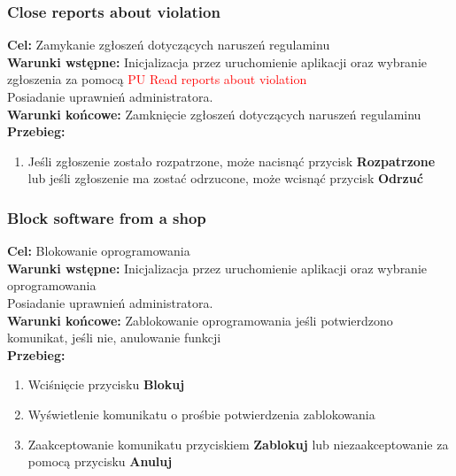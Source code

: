 \documentclass[12pt,a4paper]{article}
\begin{document}
\subsubsection{Close reports about violation}
\textbf{Cel: } Zamykanie zgłoszeń dotyczących naruszeń regulaminu\\
\textbf{Warunki wstępne:} Inicjalizacja przez uruchomienie aplikacji oraz wybranie zgłoszenia za pomocą \textcolor{red}{PU Read reports about violation}\\ Posiadanie uprawnień administratora.\\
\textbf{Warunki końcowe:} Zamknięcie zgłoszeń dotyczących naruszeń regulaminu\\
\textbf{Przebieg:}
\begin{enumerate}
    \item Jeśli zgłoszenie zostało rozpatrzone, może nacisnąć przycisk \textbf{Rozpatrzone} lub jeśli zgłoszenie ma zostać odrzucone, może wcisnąć przycisk \textbf{Odrzuć}
\end{enumerate}

\subsubsection{Block software from a shop}
\textbf{Cel: } Blokowanie oprogramowania\\
\textbf{Warunki wstępne:} Inicjalizacja przez uruchomienie aplikacji oraz wybranie oprogramowania\\ Posiadanie uprawnień administratora.\\
\textbf{Warunki końcowe:} Zablokowanie oprogramowania jeśli potwierdzono komunikat, jeśli nie, anulowanie funkcji\\
\textbf{Przebieg:}
\begin{enumerate}
    \item Wciśnięcie przycisku \textbf{Blokuj}
    \item Wyświetlenie komunikatu o prośbie potwierdzenia zablokowania
    \item Zaakceptowanie komunikatu przyciskiem \textbf{Zablokuj} lub niezaakceptowanie za pomocą przycisku \textbf{Anuluj}
\end{enumerate}
\end{document}
